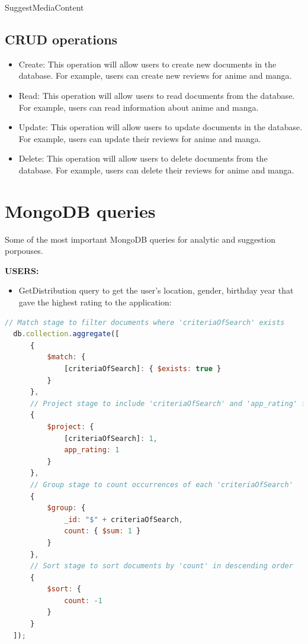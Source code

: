 SuggestMediaContent

\subsection {CRUD operations}
\begin{itemize}
    \item Create: This operation will allow users to create new documents in the database. For example, users can create new reviews for anime and manga.
    \item Read: This operation will allow users to read documents from the database. For example, users can read information about anime and manga.
    \item Update: This operation will allow users to update documents in the database. For example, users can update their reviews for anime and manga.
    \item Delete: This operation will allow users to delete documents from the database. For example, users can delete their reviews for anime and manga.
\end{itemize}


\section {MongoDB queries}
Some of the most important MongoDB queries for analytic and suggestion porpouses. 


\textbf{USERS:}
\begin{itemize}
  \item GetDistribution query to get the user's location, gender, birthday year that gave the highest rating to the application:
  
\end{itemize}
\begin{lstlisting}[language=JavaScript, caption=GetDistribution]
  // Match stage to filter documents where 'criteriaOfSearch' exists
  db.collection.aggregate([
      {
          $match: {
              [criteriaOfSearch]: { $exists: true }
          }
      },
      // Project stage to include 'criteriaOfSearch' and 'app_rating' fields
      {
          $project: {
              [criteriaOfSearch]: 1,
              app_rating: 1
          }
      },
      // Group stage to count occurrences of each 'criteriaOfSearch'
      {
          $group: {
              _id: "$" + criteriaOfSearch,
              count: { $sum: 1 }
          }
      },
      // Sort stage to sort documents by 'count' in descending order
      {
          $sort: {
              count: -1
          }
      }
  ]);
  \end{lstlisting}
  


